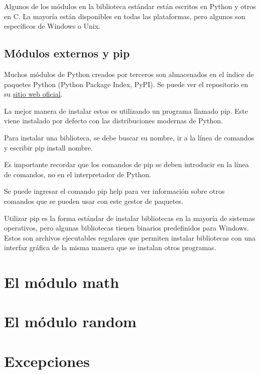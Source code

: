 \documentclass{report}
\newcommand{\link}[2]{\href{#1}{\underline{#2}}}
\begin{document}
Algunos de los módulos en la biblioteca estándar están escritos en Python y otros en C. La mayoría están disponibles en todas las plataformas, pero algunos son específicos de Windows o Unix.

\section{Módulos externos y pip}

Muchos módulos de Python creados por terceros son almacenados en el índice de paquetes Python (Python Package Index, PyPI). Se puede ver el repositorio en su \link{https://pypi.org}{sitio web oficial}.\smallskip

La mejor manera de instalar estos es utilizando un programa llamado pip. Este viene instalado por defecto con las distribuciones modernas de Python.\smallskip

Para instalar una biblioteca, se debe buscar su nombre, ir a la línea de comandos y escribir pip install nombre.


Es importante recordar que los comandos de pip se deben introducir en la línea de comandos, no en el interpretador de Python.\smallskip

Se puede ingresar el comando pip help para ver información sobre otros comandos que se pueden usar con este gestor de paquetes.


Utilizar pip es la forma estándar de instalar bibliotecas en la mayoría de sistemas operativos, pero algunas bibliotecas tienen binarios predefinidos para Windows. Estos son archivos ejecutables regulares que permiten instalar bibliotecas con una interfaz gráfica de la misma manera que se instalan otros programas.

\clearpage\chapter{El módulo math}

\clearpage\chapter{El módulo random}

\clearpage\chapter{Excepciones}
\end{document}
